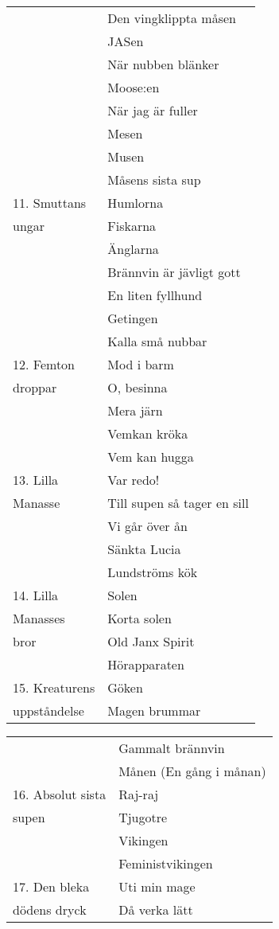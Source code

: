 \documentclass[a6paper,10pt]{article}
\begin{document}
\begin{table}[!ht]
\begin{tabularx}{1\textwidth}{l X}
&Den vingklippta måsen\\
&JASen\\
&När nubben blänker\\
&Moose:en\\
&När jag är fuller\\
&Mesen\\
&Musen\\
&Måsens sista sup\\
11. Smuttans&Humlorna\\
\hspace{17pt}ungar&Fiskarna\\
&Änglarna\\
&Brännvin är jävligt gott\\
&En liten fyllhund\\
&Getingen\\
&Kalla små nubbar\\
12. Femton&Mod i barm\\
\hspace{17pt}droppar&O, besinna\\
&Mera järn\\
&Vemkan kröka\\
&Vem kan hugga\\
13. Lilla&Var redo!\\
\hspace{17pt}Manasse&Till supen så tager en sill\\
&Vi går över ån\\
&Sänkta Lucia\\
&Lundströms kök\\
14. Lilla&Solen\\
\hspace{17pt}Manasses&Korta solen\\
\hspace{17pt}bror&Old Janx Spirit\\
&Hörapparaten\\
15. Kreaturens&Göken\\
\hspace{17pt}uppståndelse&Magen brummar
\end{tabularx}
\end{table}
\newpage
\begin{table}[!ht]
\begin{tabularx}{1\textwidth}{l X}
&Gammalt brännvin\\
&Månen (En gång i månan)\\
16. Absolut sista&Raj-raj\\
\hspace{17pt}supen&Tjugotre\\
&Vikingen\\
&Feministvikingen\\
17. Den bleka&Uti min mage\\
\hspace{17pt}dödens dryck&Då verka lätt
\end{tabularx}
\end{table}
\end{document}
